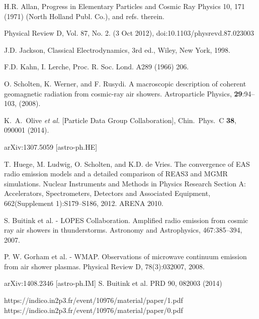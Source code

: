 \begin{thebibliography}{1}

 H.R. Allan, Progress in Elementary Particles and Cosmic Ray Physics 10, 171 (1971) (North Holland Publ. Co.), and refs. therein.

 Physical Review D, Vol. 87, No. 2. (3 Oct 2012), doi:10.1103/physrevd.87.023003 

 J.D. Jackson, Classical Electrodynamics, 3rd ed., Wiley, New York, 1998.

 F.D. Kahn, I. Lerche, Proc. R. Soc. Lond. A289 (1966) 206.

 O. Scholten, K. Werner, and F. Rusydi. A macroscopic description of coherent geomagnetic radiation from cosmic-ray air showers. Astroparticle Physics, {\bf 29}:94–103, (2008).

  K.~A.~Olive {\it et al.}  [Particle Data Group Collaboration],
  Chin.\ Phys.\ C {\bf 38}, 090001 (2014).

 arXiv:1307.5059 [astro-ph.HE]

 T. Huege, M. Ludwig, O. Scholten, and K.D. de Vries. The convergence of EAS radio emission models and a detailed comparison of REAS3 and MGMR simulations. Nuclear Instruments and Methods in Physics Research Section A: Accelerators, Spectrometers, Detectors and Associated Equipment, 662(Supplement 1):S179–S186, 2012. ARENA 2010.

 S. Buitink et al. - LOPES Collaboration. Amplified radio emission from cosmic ray air showers in thunderstorms. Astronomy and Astrophysics, 467:385–394, 2007.
 

 P. W. Gorham et al. - WMAP. Observations of microwave continuum emission from air shower plasmas. Physical Review D, 78(3):032007, 2008.

 
 arXiv:1408.2346 [astro-ph.IM]
 S. Buitink et al. PRD 90, 082003 (2014)

 https://indico.in2p3.fr/event/10976/material/paper/1.pdf
 https://indico.in2p3.fr/event/10976/material/paper/0.pdf


\end{thebibliography}
